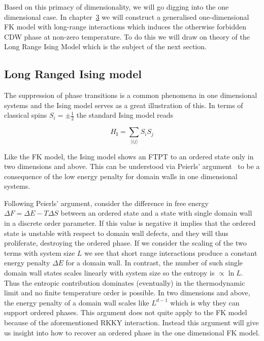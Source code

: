 Based on this primacy of dimensionality, we will go digging into the one dimensional case. In chapter~\protect\hyperlink{chap:3-the-long-range-falicov-kimball-model}{3} we will construct a generalised one-dimensional FK model with long-range interactions which induces the otherwise forbidden CDW phase at non-zero temperature. To do this we will draw on theory of the Long Range Ising Model which is the subject of the next section.

\hypertarget{long-ranged-ising-model}{%
\subsection{Long Ranged Ising model}\label{long-ranged-ising-model}}

The suppression of phase transitions is a common phenomena in one dimensional systems and the Ising model serves as a great illustration of this. In terms of classical spins \(S_i = \pm \frac{1}{2}\) the standard Ising model reads

\[H_{\mathrm{I}} = \sum_{\langle ij \rangle} S_i S_j\]

Like the FK model, the Ising model shows an FTPT to an ordered state only in two dimensions and above. This can be understood via Peierls' argument~\autocite{peierlsIsingModelFerromagnetism1936,kennedyItinerantElectronModel1986} to be a consequence of the low energy penalty for domain walls in one dimensional systems.

Following Peierls' argument, consider the difference in free energy \(\Delta F = \Delta E - T\Delta S\) between an ordered state and a state with single domain wall in a discrete order parameter. If this value is negative it implies that the ordered state is unstable with respect to domain wall defects, and they will thus proliferate, destroying the ordered phase. If we consider the scaling of the two terms with system size \(L\) we see that short range interactions produce a constant energy penalty \(\Delta E\) for a domain wall. In contrast, the number of such single domain wall states scales linearly with system size so the entropy is \(\propto \ln L\). Thus the entropic contribution dominates (eventually) in the thermodynamic limit and no finite temperature order is possible. In two dimensions and above, the energy penalty of a domain wall scales like \(L^{d-1}\) which is why they can support ordered phases. This argument does not quite apply to the FK model because of the aforementioned RKKY interaction. Instead this argument will give us insight into how to recover an ordered phase in the one dimensional FK model.

